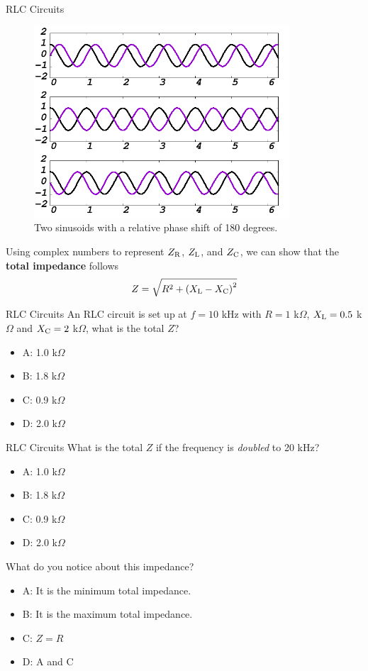 \documentclass{beamer}
\begin{document}
\begin{frame}{RLC Circuits}
\begin{figure}
\centering
\includegraphics[width=0.85\textwidth,trim=1cm 5cm 0cm 4cm,clip=true]{figures/phase2.png}
\caption{\label{fig:phase8} Two sinusoids with a relative phase shift of 180 degrees.}
\end{figure}
Using complex numbers to represent $Z_{\rm R}$, $Z_{\rm L}$, and $Z_{\rm C}$, we can show that the \textbf{\alert{total impedance}} follows
\begin{equation}
Z = \sqrt{R^2 + \left(X_{\rm L} - X_{\rm C} \right)^2}
\end{equation}
\end{frame}

\begin{frame}{RLC Circuits}
An RLC circuit is set up at $f = 10$ kHz with $R = 1$ k$\Omega$, $X_{\rm L} = 0.5$ k$\Omega$ and $X_{\rm C} = 2$ k$\Omega$, what is the total $Z$?
\begin{itemize}
\item A: 1.0 k$\Omega$
\item B: 1.8 k$\Omega$
\item C: 0.9 k$\Omega$
\item D: 2.0 k$\Omega$
\end{itemize}
\end{frame}

\begin{frame}{RLC Circuits}
What is the total $Z$ if the frequency is \textit{doubled} to 20 kHz?
\begin{itemize}
\item A: 1.0 k$\Omega$
\item B: 1.8 k$\Omega$
\item C: 0.9 k$\Omega$
\item D: 2.0 k$\Omega$
\end{itemize}
What do you notice about this impedance?
\begin{itemize}
\item A: It is the minimum total impedance.
\item B: It is the maximum total impedance.
\item C: $Z = R$
\item D: A and C
\end{itemize}
\end{frame}
\end{document}
